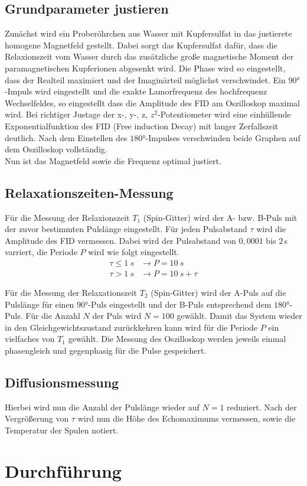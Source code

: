 \subsection{Grundparameter justieren}
Zunächst wird ein Proberöhrchen aus Wasser mit Kupfersulfat in das justierete homogene Magnetfeld gestellt. Dabei sorgt das Kupfersulfat dafür,
dass die Relaxionszeit vom Wasser durch das zusätzliche große magnetische Moment der paramagnetischen Kupferionen abgesenkt wird.
Die Phase wird so eingestellt, dass der Realteil maximiert und der Imaginärteil möglichst verschwindet.
Ein $90°$-Impuls wird eingestellt und die exakte Lamorfrequenz des hochfrequenz Wechselfeldes, so eingestellt dass die Amplitude des FID am Oszilloskop maximal wird.
Bei richtiger Justage der x-, y-, z, $z^2$-Potentiometer wird eine einhüllende Exponentialfunktion des FID (Free induction Decay) mit langer Zerfallszeit deutlich.
Nach dem Einstellen des $180°$-Impulses verschwinden beide Graphen auf dem Oszilloskop vollständig.\\
Nun ist das Magnetfeld sowie die Frequenz optimal justiert.

\subsection{Relaxationszeiten-Messung}
Für die Messung der Relaxionszeit $T_1$ (Spin-Gitter) wird der A- bzw. B-Puls mit der zuvor bestimmten
Pulslänge eingestellt. Für jeden Pulsabstand $\tau$ wird die Amplitude des FID vermessen.
Dabei wird der Pulsabstand von $0,0001$ bis $2\,$s varriert, die Periode $P$ wird wie folgt eingestellt.
\begin{align*}
    \tau \leq \SI{1}{s} &\rightarrow P= \SI{10}{s}\\
    \tau > \SI{1}{s} &\rightarrow P= \SI{10}{s} +\tau
\end{align*} 
\newline

Für die Messung der Relaxationszeit $T_2$ (Spin-Gitter) wird der A-Puls auf die Pulslänge für einen $90°$-Puls eingestellt und der B-Puls
entsprechend dem $180°$-Puls. Für die Anzahl $N$ der Puls wird $N=100$ gewählt. Damit das System wieder in den Gleichgewichtszustand
zurückkehren kann wird für die Periode $P$ ein vielfaches von $T_1$ gewählt.
Die Messung des Oszilloskop werden jeweils einmal phasengleich und gegenphasig für die Pulse gespeichert.

\subsection{Diffusionsmessung}
Hierbei wird nun die Anzahl der Pulslänge wieder auf $N=1$ reduziert. Nach der Vergrößerung von $\tau$
wird nun die Höhe des Echomaximums vermessen, sowie die Temperatur der Spulen notiert.
\section{Durchführung}
\label{sec:Durchfuehrung}
